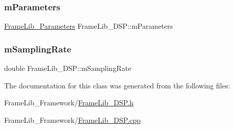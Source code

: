 \subsubsection{\texorpdfstring{m\+Parameters}{mParameters}}
{\footnotesize\ttfamily \hyperlink{class_frame_lib___parameters}{Frame\+Lib\+\_\+\+Parameters} Frame\+Lib\+\_\+\+D\+S\+P\+::m\+Parameters\hspace{0.3cm}{\ttfamily [protected]}}

\mbox{\label{class_frame_lib___d_s_p_ad638dccde211f80eedca3d898f2c6ff6}} 
\subsubsection{\texorpdfstring{m\+Sampling\+Rate}{mSamplingRate}}
{\footnotesize\ttfamily double Frame\+Lib\+\_\+\+D\+S\+P\+::m\+Sampling\+Rate\hspace{0.3cm}{\ttfamily [protected]}}



The documentation for this class was generated from the following files\+:\begin{DoxyCompactItemize}
\item 
Frame\+Lib\+\_\+\+Framework/\hyperlink{_frame_lib___d_s_p_8h}{Frame\+Lib\+\_\+\+D\+S\+P.\+h}\item 
Frame\+Lib\+\_\+\+Framework/\hyperlink{_frame_lib___d_s_p_8cpp}{Frame\+Lib\+\_\+\+D\+S\+P.\+cpp}\end{DoxyCompactItemize}
